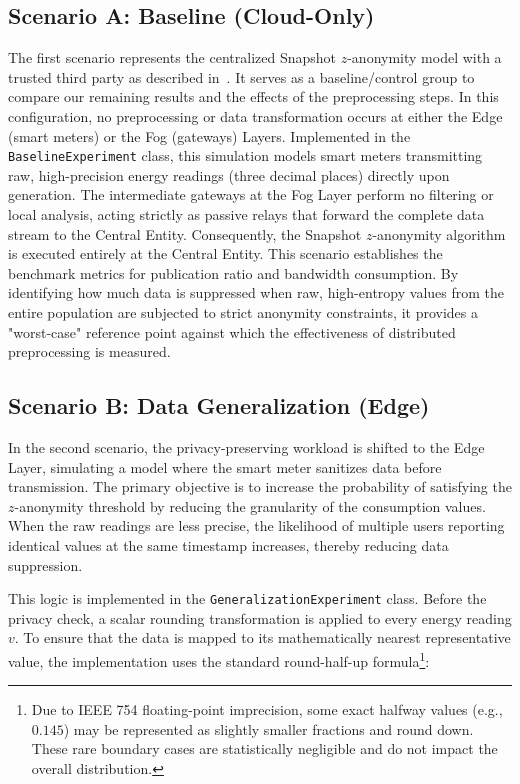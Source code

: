 \subsection{Scenario A: Baseline (Cloud-Only)}
The first scenario represents the centralized Snapshot $z$-anonymity model with a trusted third party as described in~\cite{zanonDataStreams}. It serves as a baseline/control group to compare our remaining results and the effects of the preprocessing steps. In this configuration, no preprocessing or data transformation occurs at either the Edge (smart meters) or the Fog (gateways) Layers. Implemented in the \texttt{BaselineExperiment} class, this simulation models smart meters transmitting raw, high-precision energy readings (three decimal places) directly upon generation. The intermediate gateways at the Fog Layer perform no filtering or local analysis, acting strictly as passive relays that forward the complete data stream to the Central Entity. Consequently, the Snapshot $z$-anonymity algorithm is executed entirely at the Central Entity. This scenario establishes the benchmark metrics for publication ratio and bandwidth consumption. By identifying how much data is suppressed when raw, high-entropy values from the entire population are subjected to strict anonymity constraints, it provides a "worst-case" reference point against which the effectiveness of distributed preprocessing is measured.



\subsection{Scenario B: Data Generalization (Edge)}
In the second scenario, the privacy-preserving workload is shifted to the Edge Layer, simulating a model where the smart meter sanitizes data before transmission. The primary objective is to increase the probability of satisfying the $z$-anonymity threshold by reducing the granularity of the consumption values. When the raw readings are less precise, the likelihood of multiple users reporting identical values at the same timestamp increases, thereby reducing data suppression.

This logic is implemented in the \texttt{GeneralizationExperiment} class. Before the privacy check, a scalar rounding transformation is applied to every energy reading $v$. To ensure that the data is mapped to its mathematically nearest representative value, the implementation uses the standard round-half-up formula\footnote{Due to IEEE 754 floating-point imprecision, some exact halfway values (e.g., $0.145$) may be represented as slightly smaller fractions and round down. These rare boundary cases are statistically negligible and do not impact the overall distribution.}:

